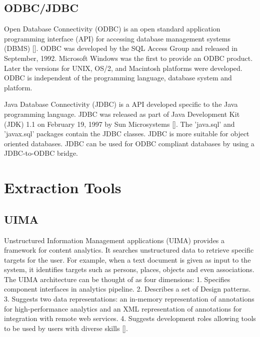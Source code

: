 \subsection{ODBC/JDBC}

Open Database Connectivity (ODBC) is an open standard application
programming interface (API) for accessing database management systems
(DBMS) [\cite{www-odbc}]. ODBC was developed by the SQL Access Group and
released in September, 1992. Microsoft Windows was the first to
provide an ODBC product. Later the versions for UNIX, OS/2, and
Macintosh platforms were developed. ODBC is independent of the
programming language, database system and platform.

Java Database Connectivity (JDBC) is a API developed specific to the
Java programming language. JDBC was released as part of Java
Development Kit (JDK) 1.1 on February 19, 1997 by Sun
Microsystems [\cite{www-jdbc}]. The 'java.sql' and 'javax.sql' packages
contain the JDBC classes. JDBC is more suitable for object oriented
databases. JDBC can be used for ODBC compliant databases by using a
JDBC-to-ODBC bridge.

\section{Extraction Tools}
\label{S:o-Tools}


\subsection{UIMA }

Unstructured Information Management applications (UIMA) provides a
framework for content analytics. It searches unstructured data to
retrieve specific targets for the user. For example, when a text
document is given as input to the system, it identifies targets such
as persons, places, objects and even associations. The UIMA
architecture can be thought of as four dimensions: 1. Specifies
component interfaces in analytics pipeline.  2. Describes a set of
Design patterns. 3. Suggests two data representations: an in-memory
representation of annotations for high-performance analytics and an
XML representation of annotations for integration with remote web
services. 4. Suggests development roles allowing tools to be used by
users with diverse skills [\cite{www-wiki-uima}].


